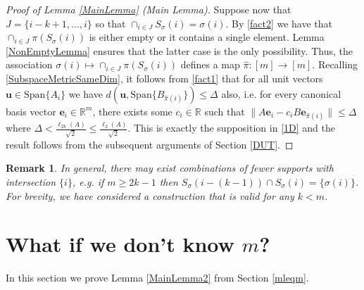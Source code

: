 \documentclass[journal, onecolumn]{IEEEtran}
\newtheorem{remark}{Remark}
\begin{document}
\begin{proof}[Proof of Lemma \ref{MainLemma} (Main Lemma)]
Suppose now that $J = \{i-k+1, \ldots, i\}$ so that $\cap_{i \in J} S_\sigma(i) = \sigma(i)$. By \eqref{fact2} we have that $\cap_{i \in J} \pi(S_\sigma(i))$ is either empty or it contains a single element. Lemma \ref{NonEmptyLemma} ensures that the latter case is the only possibility. Thus, the association $\sigma(i) \mapsto \cap_{i \in J} \pi(S_\sigma(i))$ defines a map $\hat \pi: [m] \to [m]$. Recalling \eqref{SubspaceMetricSameDim}, it follows from \eqref{fact1} that for all unit vectors $\mathbf{u} \in \text{Span}\{A_{i}\}$ we have $d\left( \mathbf{u}, \text{Span}\{B_{\hat \pi(i)}\}\right) \leq \Delta$ also, i.e. for every canonical basis vector $\mathbf{e}_i \in \mathbb{R}^m$, there exists some $c_i \in \mathbb{R}$ such that $\|A\mathbf{e}_i - c_iB\mathbf{e}_{\hat \pi(i)}\| \leq \Delta$ where $\Delta < \frac{\ell_{2k}(A)}{\sqrt{2}} \leq \frac{\ell_2(A)}{\sqrt{2}}$. This is exactly the supposition in \eqref{1D} and the result follows from the subsequent arguments of Section \ref{DUT}. 
\end{proof}

\begin{remark} In general, there may exist combinations of fewer supports with intersection $\{i\}$, e.g. if $m \geq 2k-1$ then $S_\sigma(i - (k-1)) \cap S_\sigma(i) = \{\sigma(i)\}$. For brevity, we have considered a construction that is valid for any $k < m$.
\end{remark}


\section{What if we don't know $m$?}\label{mleqmAppendix}

In this section we prove Lemma \ref{MainLemma2} from Section \ref{mleqm}.

\end{document}
